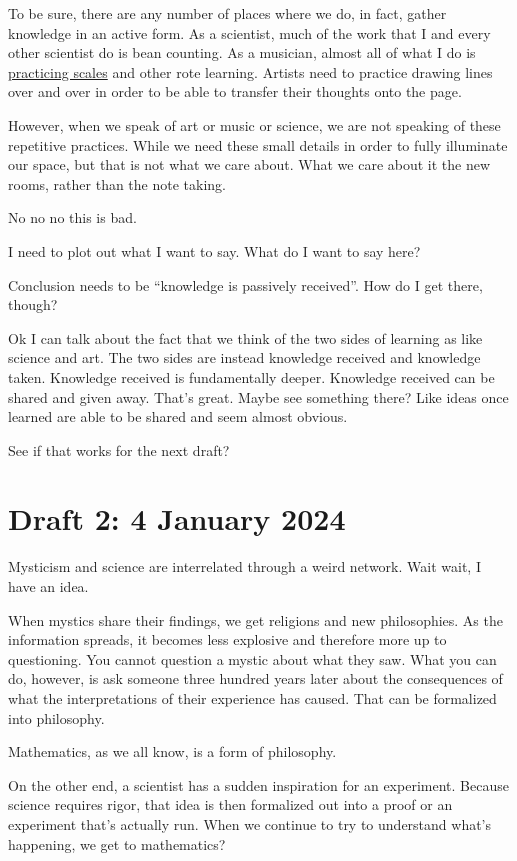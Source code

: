 \documentclass[12pt]{article}[titlepage]
\newcommand{\say}[1]{``#1''}
\renewcommand{\,}{\textsuperscript{,}}
\begin{document}
To be sure, there are any number of places where we do, in fact, gather knowledge in an active form.
As a scientist, much of the work that I and every other scientist do is bean counting.
As a musician, almost all of what I do is \href{practicing-scales.html}{practicing scales} and other rote learning.
Artists need to practice drawing lines over and over in order to be able to transfer their thoughts onto the page.

However, when we speak of art or music or science, we are not speaking of these repetitive practices.
While we need these small details in order to fully illuminate our space, but that is not what we care about.
What we care about it the new rooms, rather than the note taking.

No no no this is bad.

I need to plot out what I want to say.
What do I want to say here?

Conclusion needs to be \say{knowledge is passively received}.
How do I get there, though?

Ok I can talk about the fact that we think of the two sides of learning as like science and art.
The two sides are instead knowledge received and knowledge taken.
Knowledge received is fundamentally deeper.
Knowledge received can be shared and given away.
That's great.
Maybe see something there?
Like ideas once learned are able to be shared and seem almost obvious.

See if that works for the next draft?
\section{Draft 2: 4 January 2024}
\endnoteversion[b]
Mysticism and science are interrelated through a weird network.
Wait wait, I have an idea.

When mystics share their findings, we get religions and new philosophies.
As the information spreads, it becomes less explosive and therefore more up to questioning.
You cannot question a mystic about what they saw.
What you can do, however, is ask someone three hundred years later about the consequences of what the interpretations of their experience has caused.
That can be formalized into philosophy.

Mathematics, as we all know, is a form of philosophy.

On the other end, a scientist has a sudden inspiration for an experiment.
Because science requires rigor, that idea is then formalized out into a proof or an experiment that's actually run.
When we continue to try to understand what's happening, we get to mathematics?\endnotemark[1]
\end{document}
